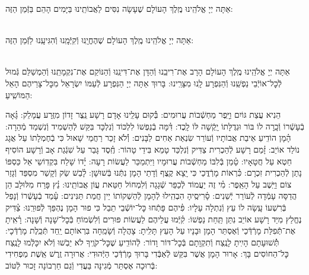 \documentclass[twoside, openany, parskip=half, 11pt]{book}
\begin{document}
\begin{sometimes}
אַתָּה יְיָ אֱלֹהֵֽינוּ מֶֽלֶךְ הָעוֹלָם שֶׁעָשָׂה נִסִּים לַאֲבוֹתֵֽינוּ בַּיָּמִים הָהֵם בַּזְּֿמַן הַזֶּה:

\\
אַתָּה יְיָ אֱלֹהֵֽינוּ מֶֽלֶךְ הָעוֹלָם שֶׁהֶחֱיָֽנוּ וְֿקִיְּֿמָֽנוּ וְֿהִגִּיעָֽנוּ לַזְּֿמַן הַזֶּה:


 \\
אַתָּה יְיָ אֱלֹהֵֽינוּ מֶֽלֶךְ הָעוֹלָם הָרָב אֶת־רִיבֵֽנוּ וְֿהַדָּן אֶת־דִּינֵֽנוּ וְֿהַנּוֹקֵם אֶת־נִקְמָתֵֽנוּ וְֿהַמְשַׁלֵּם גְּֿמוּל לְֿכׇל־אוֹיְֿבֵי נַפְשֵֽׁנוּ וְֿהַנִּפְרָע לָֽנוּ מִצָּרֵֽינוּ: בָּרוּךְ אַתָּה יְיָ הַנִּפְרָע לְֿעַמּוֹ יִשְׂרָאֵל מִכׇּל־צָרֵיהֶם הָאֵל הַמּוֹשִֽׁיעַ:



הֵנִיא עֲצַת גּוֹיִם וַיָּֽפֶר מַחְשְֿׁבוֹת עֲרוּמִים: \hfill \break
בְּֿ֗קוּם עָלֵֽינוּ אָדָם רָשָׁע נֵֽצֶר זָדוֹן מִזֶּֽרַע עֲמָלֵק: \hfill \break
גָּ֗אָה בְֿעָשְֿׁרוֹ וְֿכָֽרָה לוֹ בּוֹר וּגְדֻלָּתוֹ יָֽקְֿשָׁה לּוֹ לָֽכֶד: \hfill \break
דִּ֗מָּה בְֿנַפְשׁוֹ לִלְכּוֹד וְֿנִלְכָּד בִּקֵּשׁ לְֿהַשְׁמִיד וְֿנִשְׁמַד מְֿהֵרָה: \hfill \break
הָ֗מָן הוֹדִֽיעַ אֵיבַת אֲבוֹתָיו וְֿעוֹרֵר שִׂנְאַת אַחִים לַבָּנִים: \hfill \break
וְֿ֗לֹא זָכַר רַחֲמֵי שָׁאוּל כִּי בְֿחֶמְלָתוֹ עַל אֲגָג נוֹלַד אוֹיֵב: \hfill \break
זָ֗מַם רָשָׁע לְֿהַכְרִית צַדִּיק וְֿנִלְכַּד טָמֵא בִּידֵי טָהוֹר: \hfill \break
חֶֽ֗סֶד גָּבַר עַל שִׁגְֿגַת אָב וְֿרָשָׁע הוֹסִיף חֵטְא עַל חֲטָאָיו: \hfill \break
טָ֗מַן בְּֿלִבּוֹ מַחְשְֿׁבוֹת עֲרוּמָיו וַיִּתְמַכֵּר לַעֲשׂוֹת רָעָה: \hfill \break
יָ֗דוֹ שָׁלַח בִּקְדֽוֹשֵי אֵל כַּסְפּוֹ נָתַן לְֿהַכְרִית זִכְרָם: \hfill \break
כִּ֗רְאוֹת מָרְֿדֳּכַי כִּי יָֽצָא קֶֽצֶף וְֿדָתֵי הָמָן נִתְּֿנוּ בְּֿשׁוּשָׁן: \hfill \break
לָ֗בַשׁ שַׂק וְֿקָשַׁר מִסְפֵּד וְֿגָזַר צוֹם וַיֵּֽשֶׁב עַל הָאֵֽפֶר: \hfill \break
מִ֗י זֶה יַעֲמוֹד לְֿכַפֵּר שְֿׁגָגָה וְֿלִמְחוֹל חַטַּאת עֲוֹן אֲבוֹתֵֽינוּ: \hfill \break
נֵ֗ץ פָּרַח מִלּוּלָב הֵן הֲדַסָּה עָמְֿדָה לְֿעוֹרֵר יְֿשֵׁנִים: \hfill \break
סָ֗רִיסֶֽיהָ הִבְהִֽילוּ לְֿהָמָן לְֿהַשְׁקוֹתוֹ יֵין חֲמַת תַּנִּינִים: \hfill \break
עָ֗מַד בְֿעָשְֿׁרוֹ וְֿנָפַל בְּֿרִשְׁעוֹ עָֽשָׂה לוֹ עֵץ וְֿנִתְלָה עָלָיו: \hfill \break
פִּ֗יהֶם פָּתְֿחוּ כׇּל־יוֹשְֿׁבֵי תֵבֵל כִּי פוּר הָמָן נֶהְפַּךְ לְֿפוּרֵֽנוּ: \hfill \break
צַ֗דִּיק נֶחֱלַץ מִיַּד רָשָׁע אוֹיֵב נִתַּן תַּֽחַת נַפְשׁוֹ: \hfill \break
קִ֗יְּֿמוּ עֲלֵיהֶם לַעֲשׂוֹת פּוּרִים וְֿלִשְׂמוֹחַ בְּֿכׇל־שָׁנָה וְֿשָׁנָה: \hfill \break
רָ֗אִֽיתָ אֶת־תְּֿֿפִלַּת מָרְֿדְּֿכַי וְֿאֶסְתֵּר הָמָן וּבָנָיו עַל הָעֵץ תָּלִֽיתָ: \hfill \break
{}
צָהֲלָה וְֿשָׂמֵֽחָה בִּרְאוֹתָם יַֽחַד תְּֿכֵֽלֶת מָרְֿדְּֿכָי: \hfill \break
תְּֿ֗שׁוּעָתָם הָיִֽיתָ לָנֶֽצַח וְֿתִקְוָתָם בְּֿכׇל־דּוֹר וָדוֹר: \hfill \break
לְֿהוֹדִֽיעַ שֶׁכׇּל־קֹוֶֽיךָ לֹא יֵבֹֽשׁוּ וְֿלֹא יִכָּלְֿמוּ לָנֶֽצַח כׇּל־הַחוֹסִים בָּךְ: \hfill \break
אָרוּר הָמָן אֲשֶׁר בִּקֵּשׁ לְֿאַבְּֿדִי בָּרוּךְ מָרְֿדְּֿכַי הַיְּֿהוּדִי: \hfill \break
אֲרוּרָה זֶֽרֶשׁ אֵֽשֶׁת מַפְחִידִי בְּֿרוּכָה אֶסְתֵּר מְֿגִינָּה בַּעֲדִי וְֿגַם חַרְבוֹנָה זָכוּר לְֿטּוֹב:


\end{sometimes}
\end{document}
